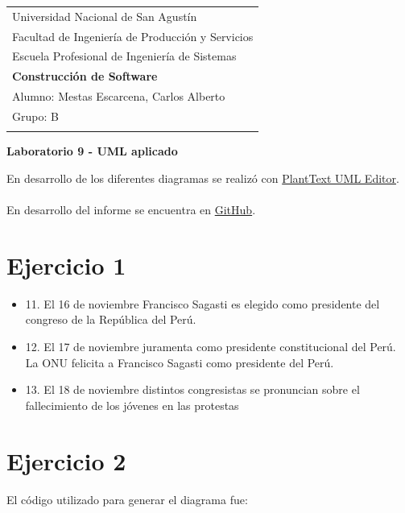 \documentclass[a4paper,12pt]{article}
\begin{document}
\thispagestyle{empty}

\begin{tabular}{p{15.5cm}} 
\large Universidad Nacional de San Agustín \\ 
\large Facultad de Ingeniería de Producción y Servicios \\
\large Escuela Profesional de Ingeniería de Sistemas \\
{\LARGE \bf Construcción de Software} \\
\vspace{1mm}
Alumno: Mestas Escarcena, Carlos Alberto \\
Grupo: B \\
\hline \\
\end{tabular} 

\begin{center} 
	{\LARGE \bf Laboratorio 9 - UML aplicado}
	\vspace{2mm}
\end{center}  

En desarrollo de los diferentes diagramas se realizó con  \textcolor{blue}{
    \href{https://www.planttext.com/}{PlantText UML Editor}}.
\\
\\
En desarrollo del informe se encuentra en \textcolor{blue}{
    \href{https://github.com/CarlosMestas/CS_CarlosMestas_Laboratorio_9}{GitHub}}.

\section*{Ejercicio 1}

\begin{itemize}
    \item 11. El 16 de noviembre Francisco Sagasti es elegido como presidente del congreso de la República del Perú.
    \item 12. El 17 de noviembre juramenta como presidente constitucional del Perú. La ONU felicita a Francisco Sagasti como presidente del Perú.
    \item 13. El 18 de noviembre distintos congresistas se pronuncian sobre el fallecimiento de los jóvenes en las protestas
\end{itemize}

\section*{Ejercicio 2}

El código utilizado para generar el diagrama fue:
\end{document}

